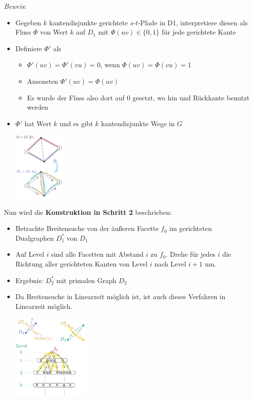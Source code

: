 \textit{Beweis}: 
\begin{itemize}
	\item Gegeben $k$ kantendisjunkte gerichtete $s$-$t$-Pfade in D1, interpretiere diesen als Fluss $\Phi$ von Wert $k$ auf $D_1$ mit $\Phi(uv)\in\{0,1\}$ für jede gerichtete Kante
	\item Definiere $\Phi'$ als
	\begin{itemize}
		\item $\Phi'(uv)=\Phi'(vu)=0$, wenn $\Phi(uv)=\Phi(vu)=1$
		\item Ansonsten $\Phi'(uv)=\Phi(uv)$
		\item Es wurde der Fluss also dort auf 0 gesetzt, wo hin und Rückkante benutzt werden
	\end{itemize}
	\item $\Phi'$ hat Wert $k$ und es gibt $k$ kantendisjunkte Wege in $G$
	\begin{center}
		\includegraphics[width=0.2\textwidth]{images/menger-1.png}
	\end{center}
\end{itemize}
\bigskip
Nun wird die \textbf{Konstruktion in Schritt 2} beschrieben:
\begin{itemize}
	\item Betrachte Breitensuche von der äußeren Facette $f_0$ im gerichteten Dualgraphen $D_1^*$ von $D_1$
	\item Auf Level $i$ sind alle Facetten mit Abstand $i$ zu $f_0$. Drehe für jedes $i$ die Richtung aller gerichteten Kanten von Level $i$ nach Level $i+1$ um.
	\item Ergebnis: $D_2^*$ mit primalen Graph $D_2$
	\item Da Breitensuche in Linearzeit möglich ist, ist auch dieses Verfahren in Linearzeit möglich.
	\begin{center}
		\includegraphics[width=0.3\textwidth]{images/menger-3.png}
	\end{center}
\end{itemize}

